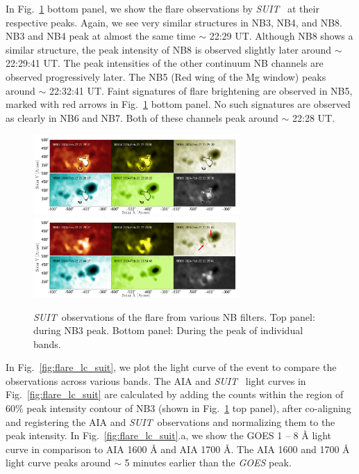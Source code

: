 \documentclass[lineno, pdflatex,sn-mathphys-ay]{sn-jnl}%
\newcommand{\suit}{{\it{SUIT}}}
\begin{document}
In Fig.~\ref{fig:flare_nb3_peak} bottom panel, we show the flare observations by \suit~ at their respective peaks. Again, we see very similar structures in NB3, NB4, and NB8. NB3 and NB4 peak at almost the same time $\sim$ 22:29 UT. Although NB8 shows a similar structure, the peak intensity of NB8 is observed slightly later around $\sim$ 22:29:41 UT. The peak intensities of the other continuum NB channels are observed progressively later. The NB5 (Red wing of the Mg window) peaks around $\sim$ 22:32:41 UT. Faint signatures of flare brightening are observed in NB5, marked with red arrows in Fig.~\ref{fig:flare_nb3_peak} bottom panel. No such signatures are observed as clearly in NB6 and NB7. Both of these channels peak around $\sim$ 22:28 UT.

\begin{figure}
    \centering
    \includegraphics[trim={0cm 0.65cm 0cm 0cm},clip,width=0.7\textwidth]{suit_roi_nb3_peak.pdf} \\
    \includegraphics[width=0.7\textwidth]{suit_roi_all_peak.pdf}
    \caption{\suit~observations of the flare from various NB filters. Top panel: during NB3 peak. Bottom panel: During the peak of individual bands.}
    \label{fig:flare_nb3_peak}
\end{figure}

In Fig.~\ref{fig:flare_lc_suit}, we plot the light curve of the event to compare the observations across various bands. The AIA and \suit~ light curves in Fig.~\ref{fig:flare_lc_suit} are calculated by adding the counts within the region of 60\% peak intensity contour of NB3 (shown in Fig.~\ref{fig:flare_nb3_peak} top panel), after co-aligning and registering the AIA and \suit~observations and normalizing them to the peak intensity. In Fig.~\ref{fig:flare_lc_suit}.a, we show the GOES 1 {--} 8 {\AA} light curve in comparison to AIA 1600 {\AA} and AIA 1700 {\AA}. The AIA 1600 and 1700 {\AA} light curve peaks around $\sim$ 5 minutes earlier than the {\it GOES} peak. 
\end{document}
